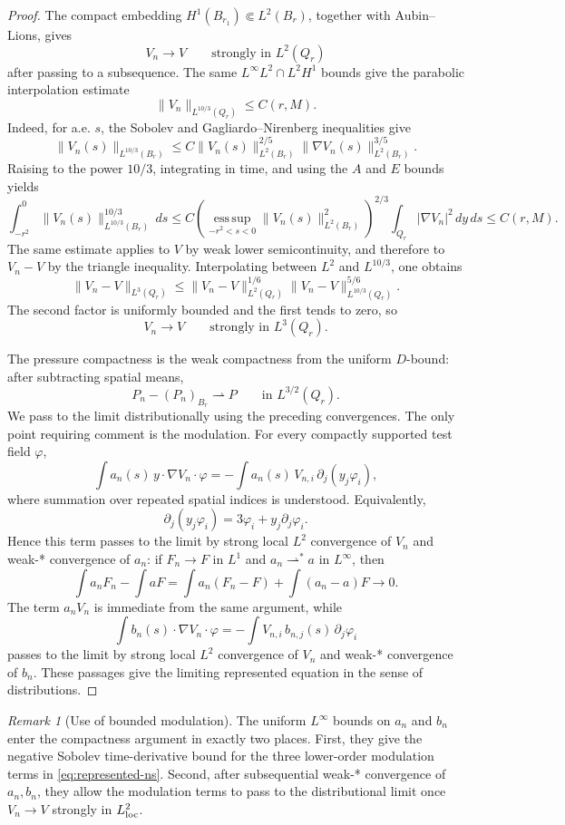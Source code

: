 \documentclass[11pt]{amsart}
\theoremstyle{plain}
\theoremstyle{definition}
\theoremstyle{remark}
\newtheorem{remark}[theorem]{Remark}
\begin{document}
\begin{proof}
The compact embedding \(H^1(B_{r_1})\Subset L^2(B_r)\), together with
Aubin--Lions, gives
\[
  V_n\to V\qquad\text{strongly in }L^2(Q_r)
\]
after passing to a subsequence.  The same \(L^\infty L^2\cap L^2H^1\) bounds
give the parabolic interpolation estimate
\[
  \|V_n\|_{L^{10/3}(Q_r)}\le C(r,M).
\]
Indeed, for a.e. \(s\), the Sobolev and Gagliardo--Nirenberg inequalities give
\[
  \|V_n(s)\|_{L^{10/3}(B_r)}
  \le
  C\|V_n(s)\|_{L^2(B_r)}^{2/5}
  \|\nabla V_n(s)\|_{L^2(B_r)}^{3/5}.
\]
Raising to the power \(10/3\), integrating in time, and using the \(A\) and
\(E\) bounds yields
\[
  \int_{-r^2}^0\|V_n(s)\|_{L^{10/3}(B_r)}^{10/3}\,ds
  \le
  C
  \left(\operatorname*{ess\,sup}_{-r^2<s<0}
  \|V_n(s)\|_{L^2(B_r)}^2\right)^{2/3}
  \int_{Q_r}|\nabla V_n|^2\,dy\,ds
  \le C(r,M).
\]
The same estimate applies to \(V\) by weak lower semicontinuity, and therefore
to \(V_n-V\) by the triangle inequality.  Interpolating between \(L^2\) and
\(L^{10/3}\), one obtains
\[
  \|V_n-V\|_{L^3(Q_r)}
  \le
  \|V_n-V\|_{L^2(Q_r)}^{1/6}
  \|V_n-V\|_{L^{10/3}(Q_r)}^{5/6}.
\]
The second factor is uniformly bounded and the first tends to zero, so
\[
  V_n\to V\qquad\text{strongly in }L^3(Q_r).
\]

The pressure compactness is the weak compactness from the uniform \(D\)-bound:
after subtracting spatial means,
\[
  P_n-(P_n)_{B_r}
  \rightharpoonup P
  \qquad\text{in }L^{3/2}(Q_r).
\]
We pass to the limit distributionally using the preceding convergences.  The
only point requiring comment is the modulation.  For every compactly supported
test field \(\varphi\),
\[
  \int a_n(s)\, y\cdot\nabla V_n\cdot\varphi
  =
  -\int a_n(s)\,V_{n,i}\,\partial_j(y_j\varphi_i),
\]
where summation over repeated spatial indices is understood.  Equivalently,
\[
  \partial_j(y_j\varphi_i)=3\varphi_i+y_j\partial_j\varphi_i .
\]
Hence this term passes to the limit by strong local \(L^2\) convergence of
\(V_n\) and weak-* convergence of \(a_n\): if \(F_n\to F\) in \(L^1\) and
\(a_n\rightharpoonup^* a\) in \(L^\infty\), then
\[
  \int a_nF_n-\int aF
  =
  \int a_n(F_n-F)+\int (a_n-a)F\to0.
\]
The term \(a_nV_n\) is immediate from the same argument, while
\[
  \int b_n(s)\cdot\nabla V_n\cdot\varphi
  =
  -\int V_{n,i}\,b_{n,j}(s)\,\partial_j\varphi_i
\]
passes to the limit by strong local \(L^2\) convergence of \(V_n\) and weak-*
convergence of \(b_n\).  These passages give the limiting represented equation
in the sense of distributions.
\end{proof}

\begin{remark}[Use of bounded modulation]\label{rem:bounded-modulation}
The uniform \(L^\infty\) bounds on \(a_n\) and \(b_n\) enter the compactness
argument in exactly two places.  First, they give the negative Sobolev
time-derivative bound for the three lower-order modulation terms in
\eqref{eq:represented-ns}.  Second, after subsequential weak-* convergence of
\(a_n,b_n\), they allow the modulation terms to pass to the distributional
limit once \(V_n\to V\) strongly in \(L^2_{\rm loc}\).
\end{remark}
\end{document}
